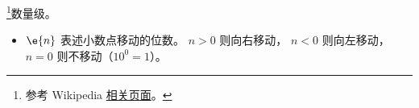 
\begin{issues}
\issueDraft
\end{issues}

\footnote{参考 Wikipedia \href{https://en.wikipedia.org/wiki/Order_of_magnitude}{相关页面}。}数量级。

\begin{itemize}
\item $\e{n}$ 表述小数点移动的位数。 $n > 0$ 则向右移动， $n < 0$ 则向左移动， $n=0$ 则不移动（$10^{0} = 1$）。
\end{itemize}

